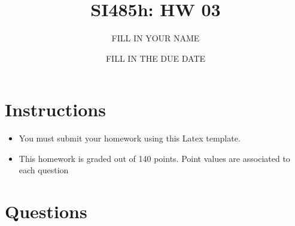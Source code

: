 \documentclass{article}[9pt]
\title{SI485h: HW 03}
\date{FILL IN THE DUE DATE}
\author{FILL IN YOUR NAME}
\begin{document}
\maketitle

\section*{Instructions}


\begin{itemize}
  \item You must submit your homework using this Latex template.

\item This homework is graded out of 140 points. Point values are associated to each question
\end{itemize}

\section*{Questions}
\end{document}
